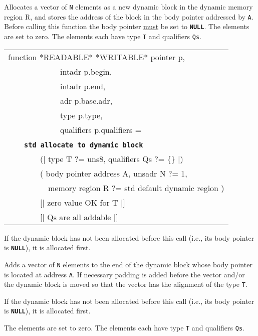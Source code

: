 \documentclass[12pt]{article}
\makeatletter
\newcommand{\TT}[1]{{\tt \bfseries #1}}
\newcommand{\ttstdlkey}[2]{\TT{std #1 #2}\index{#1@{\tt std #1}!#2@{\tt #2}}}
\newenvironment{indpar}[1][0.3in]%
	{\begin{list}{}%
		     {\setlength{\itemsep}{0in}%
		      \setlength{\topsep}{0in}%
		      \setlength{\parsep}{1ex}%
		      \setlength{\labelwidth}{#1}%
		      \setlength{\leftmargin}{#1}%
		      \addtolength{\leftmargin}{\labelsep}}%
	 \item}%
	{\end{list}}
\makeatother
\begin{document}
\begin{indpar}
\begin{indpar}
Allocates a vector of {\tt N} elements as a new dynamic block in
the dynamic memory region R, and stores the address of the block
in the body pointer addressed by {\tt A}.  Before calling this
function the body pointer \underline{must} be set to \TT{NULL}.
The elements are set to zero.
The elements each have type {\tt T} and qualifiers {\tt Qs}.
\end{indpar}

{\tt\begin{tabular}{@{}l}
function *READABLE* *WRITABLE* pointer p, \\
~~~~~~~~~~~~~intadr p.begin, \\
~~~~~~~~~~~~~intadr p.end, \\
~~~~~~~~~~~~~adr p.base.adr, \\
~~~~~~~~~~~~~type p.type, \\
~~~~~~~~~~~~~qualifiers p.qualifiers = \\
~~~~\ttstdlkey{allocate}{to dynamic block} \\
~~~~~~~~(| type T ?= uns8, qualifiers Qs ?= \{\} |) \\
~~~~~~~~( body pointer address A, unsadr N ?= 1, \\
~~~~~~~~~~memory region R ?= std default dynamic region ) \\
~~~~~~~~[| zero value OK for T |] \\
~~~~~~~~[| Qs are all addable |] \\
\end{tabular}}\label{POINTER-ALLOCATE-TO-DYNAMIC-BLOCK}

\begin{indpar}
If the dynamic block has not been allocated before this call
(i.e., its body pointer is \TT{NULL}),
it is allocated first.

Adds a vector of {\tt N} elements to the end of the dynamic block
whose body pointer is located at address {\tt A}.
If necessary padding is added before the vector and/or
the dynamic block is moved so that the vector has the alignment of
the type {\tt T}.

If the dynamic block has not been allocated before this call
(i.e., its body pointer is \TT{NULL}),
it is allocated first.

The elements are set to zero.
The elements each have type {\tt T} and qualifiers {\tt Qs}.
\end{indpar}

\end{indpar}
\end{document}
